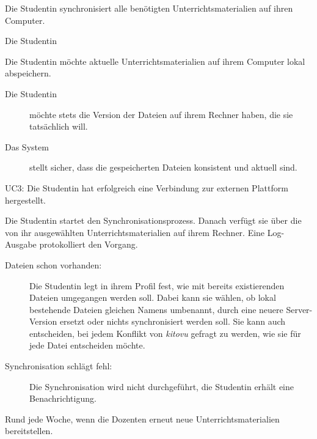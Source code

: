 \documentclass[a4paper]{article}
\begin{document}
\begin{description}[uclist]
  \item[Goal] Die Studentin synchronisiert alle benötigten Unterrichtsmaterialien auf ihren Computer.
  \item[Primary Actor] Die Studentin
  \item[Trigger] Die Studentin möchte aktuelle Unterrichtsmaterialien auf ihrem Computer lokal abspeichern.
  \item[Stakeholders and Interests]
    \begin{description}
      \item[Die Studentin] möchte stets die Version der Dateien auf ihrem Rechner haben, die sie tatsächlich will.
      \item[Das System] stellt sicher, dass die gespeicherten Dateien konsistent und aktuell sind.
    \end{description}
  \item[Preconditions] UC3: Die Studentin hat erfolgreich eine Verbindung zur externen Plattform hergestellt.
  \item[Main Success Scenario] Die Studentin startet den Synchronisationsprozess. Danach verfügt sie über die von ihr ausgewählten Unterrichtsmaterialien auf ihrem Rechner. Eine Log-Ausgabe protokolliert den Vorgang.
  \item[Extensions]
    \begin{description}
      \item[Dateien schon vorhanden:] Die Studentin legt in ihrem Profil fest, wie mit bereits existierenden Dateien umgegangen werden soll. Dabei kann sie wählen, ob lokal bestehende Dateien gleichen Namens umbenannt, durch eine neuere Server-Version ersetzt oder nichts synchronisiert werden soll. Sie kann auch entscheiden, bei jedem Konflikt von \emph{kitovu} gefragt zu werden, wie sie für jede Datei entscheiden möchte.
      \item[Synchronisation schlägt fehl:] Die Synchronisation wird nicht durchgeführt, die Studentin erhält eine Benachrichtigung.
    \end{description}
  \item[Frequency of Occurrence] Rund jede Woche, wenn die Dozenten erneut neue Unterrichtsmaterialien bereitstellen.
\end{description}
\end{document}
